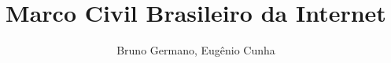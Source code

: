 \title{Marco Civil Brasileiro da Internet}

\author{Bruno Germano, Eugênio Cunha}

\address{Universidade de Itaúna (UIT)\\
  Caixa Postal 100 -- 35.680-142 -- Itaúna -- MG -- Brasil
}